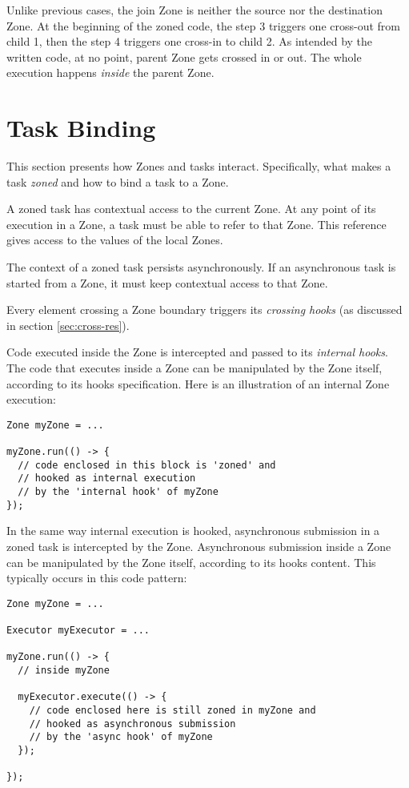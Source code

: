 Unlike previous cases, the join Zone is neither the source nor the destination Zone. At the beginning of the zoned code, the step 3 triggers one cross-out from child 1, then the step 4 triggers one cross-in to child 2. As intended by the written code, at no point, parent Zone gets crossed in or out. The whole execution happens \emph{inside} the parent Zone.

\section{Task Binding}

This section presents how Zones and tasks interact. Specifically, what makes a task \emph{zoned} and how to bind a task to a Zone.

A zoned task has contextual access to the current Zone. At any point of its execution in a Zone, a task must be able to refer to that Zone. This reference gives access to the values of the local Zones.

The context of a zoned task persists asynchronously. If an asynchronous task is started from a Zone, it must keep contextual access to that Zone.

Every element crossing a Zone boundary triggers its \emph{crossing hooks} (as discussed in section \ref{sec:cross-res}).

Code executed inside the Zone is intercepted and passed to its \emph{internal hooks}. The code that executes inside a Zone can be manipulated by the Zone itself, according to its hooks specification. Here is an illustration of an internal Zone execution:

\begin{lstlisting}
Zone myZone = ...

myZone.run(() -> {
  // code enclosed in this block is 'zoned' and
  // hooked as internal execution
  // by the 'internal hook' of myZone
});
\end{lstlisting}

In the same way internal execution is hooked, asynchronous submission in a zoned task is intercepted by the Zone.
Asynchronous submission inside a Zone can be manipulated by the Zone itself, according to its hooks content. This typically occurs in this code pattern:

\begin{lstlisting}
Zone myZone = ...

Executor myExecutor = ...

myZone.run(() -> {
  // inside myZone

  myExecutor.execute(() -> {
    // code enclosed here is still zoned in myZone and
    // hooked as asynchronous submission
    // by the 'async hook' of myZone
  });
  
});
\end{lstlisting}

